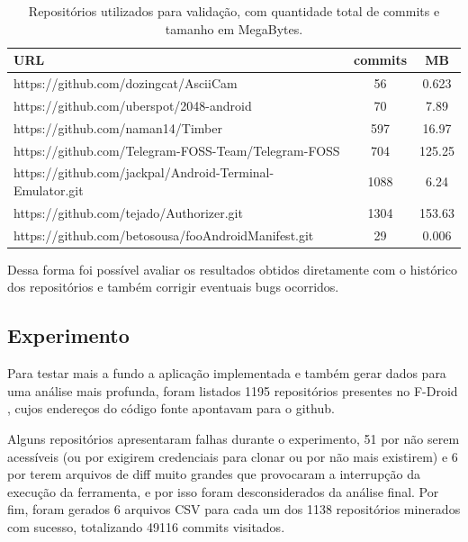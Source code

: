 \documentclass[a4paper,12pt]{article}
\begin{document}

\begin{table}[h]
\begin{center}
\begin{tabular}{l|c|c}

 URL & commits & MB\\
\hline
https://github.com/dozingcat/AsciiCam & 56 & 0.623  \\
https://github.com/uberspot/2048-android & 70 & 7.89 \\
https://github.com/naman14/Timber & 597 & 16.97  \\
https://github.com/Telegram-FOSS-Team/Telegram-FOSS & 704 & 125.25  \\
https://github.com/jackpal/Android-Terminal-Emulator.git & 1088 & 6.24 \\
https://github.com/tejado/Authorizer.git & 1304 & 153.63 \\
https://github.com/betosousa/fooAndroidManifest.git & 29 & 0.006
\end{tabular}
\caption{Repositórios utilizados para validação, com quantidade total de commits e tamanho em MegaBytes.}
\end{center}
\end{table}


Dessa forma foi possível avaliar os resultados obtidos diretamente com o histórico dos repositórios e também corrigir eventuais bugs ocorridos.


\subsection{Experimento}%
\label{sec:experimentos}

Para testar mais a fundo a aplicação implementada e também gerar dados para uma análise  mais profunda, foram listados 1195 repositórios presentes no F-Droid \cite{fdroid}, cujos endereços do código fonte apontavam para o github.

Alguns repositórios apresentaram falhas durante o experimento, 51 por não serem acessíveis (ou por exigirem credenciais para clonar ou por não mais existirem) e 6 por terem arquivos de diff muito grandes que provocaram a interrupção da execução da ferramenta, e por isso foram desconsiderados da análise final. Por fim, foram gerados 6 arquivos CSV para cada um dos 1138 repositórios minerados com sucesso, totalizando 49116 commits visitados.
\end{document}
